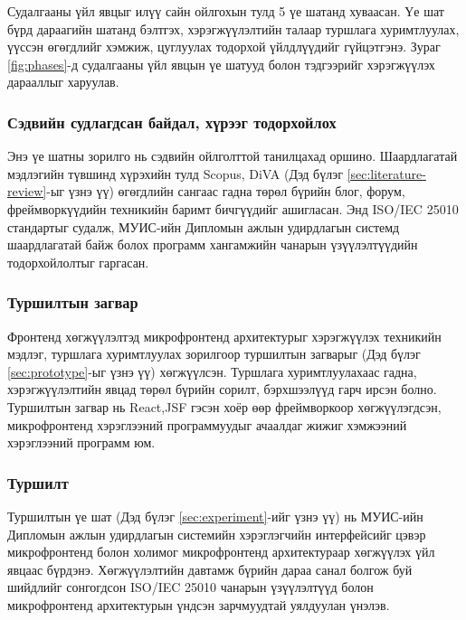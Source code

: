 \hspace*{0.6cm}Судалгааны үйл явцыг илүү сайн ойлгохын тулд 5 үе шатанд хуваасан. Үе шат бүрд дараагийн шатанд бэлтгэх, хэрэгжүүлэлтийн талаар туршлага хуримтлуулах, үүссэн өгөгдлийг хэмжиж, цуглуулах тодорхой үйлдлүүдийг гүйцэтгэнэ. Зураг \ref{fig:phases}-д судалгааны үйл явцын үе шатууд болон тэдгээрийг хэрэгжүүлэх дарааллыг харуулав.
\subsubsection{Сэдвийн судлагдсан байдал, хүрээг тодорхойлох}
\hspace*{0.6cm}Энэ үе шатны зорилго нь сэдвийн ойлголттой танилцахад оршино. Шаардлагатай мэдлэгийн түвшинд хүрэхийн тулд Scopus, DiVA (Дэд бүлэг \ref{sec:literature-review}-ыг үзнэ үү) өгөгдлийн сангаас гадна төрөл бүрийн блог, форум, фреймворкүүдийн техникийн баримт бичгүүдийг ашигласан. Энд ISO/IEC 25010 стандартыг судалж, МУИС-ийн Дипломын ажлын удирдлагын системд шаардлагатай байж болох программ хангамжийн чанарын үзүүлэлтүүдийн тодорхойлолтыг гаргасан.
\subsubsection{Туршилтын загвар}
\hspace*{0.6cm}Фронтенд хөгжүүлэлтэд микрофронтенд архитектурыг хэрэгжүүлэх техникийн мэдлэг, туршлага хуримтлуулах зорилгоор туршилтын загварыг (Дэд бүлэг \ref{sec:prototype}-ыг үзнэ үү) хөгжүүлсэн. Туршлага хуримтлуулахаас гадна, хэрэгжүүлэлтийн явцад төрөл бүрийн сорилт, бэрхшээлүүд гарч ирсэн болно. Туршилтын загвар нь React,JSF гэсэн хоёр өөр фреймворкоор хөгжүүлэгдсэн, микрофронтенд хэрэглээний программуудыг ачаалдаг жижиг хэмжээний хэрэглээний программ юм.

\subsubsection{Туршилт}
\hspace*{0.6cm}Туршилтын үе шат (Дэд бүлэг \ref{sec:experiment}-ийг үзнэ үү) нь МУИС-ийн Дипломын ажлын удирдлагын системийн хэрэглэгчийн интерфейсийг цэвэр микрофронтенд болон холимог микрофронтенд архитектураар хөгжүүлэх үйл явцаас бүрдэнэ. Хөгжүүлэлтийн давтамж бүрийн дараа санал болгож буй шийдлийг сонгогдсон ISO/IEC 25010 чанарын үзүүлэлтүүд болон микрофронтенд архитектурын үндсэн зарчмуудтай уялдуулан үнэлэв.


